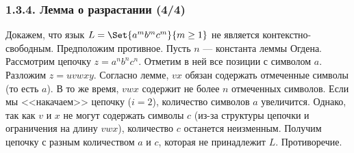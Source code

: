 \begin{frame}
\frametitle{1.3.4. Лемма о разрастании (4/4)}

\begin{example}
Докажем, что язык $L = \Set{a^m b^m c^m}{m \ge 1}$ не является контекстно-свободным.
Предположим противное. Пусть $n$ — константа леммы Огдена.
Рассмотрим цепочку $z = a^n b^n c^n$. Отметим в ней все позиции с символом $a$.
Разложим $z = u v w x y$.
Согласно лемме, $vx$ обязан содержать отмеченные символы (то есть $a$).
В то же время, $vwx$ содержит не более $n$ отмеченных символов.
Если мы <<накачаем>> цепочку ($i=2$), количество символов $a$ увеличится.
Однако, так как $v$ и $x$ не могут содержать символы $c$ (из-за структуры цепочки и ограничения на длину $vwx$), количество $c$ останется неизменным.
Получим цепочку с разным количеством $a$ и $c$, которая не принадлежит $L$.
Противоречие.
\end{example}

\bigskip
{}

\end{frame}

